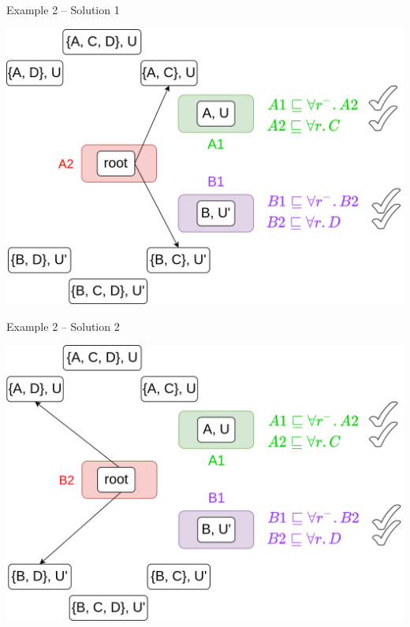 \documentclass[10pt]{beamer}
\begin{document}
\begin{frame}[fragile]{Example 2 -- Solution 1}
  \begin{center}
  \includegraphics[scale=.25]{img/ex2_3.png}
  \end{center}
\end{frame}

\begin{frame}[fragile]{Example 2 -- Solution 2}
  \begin{center}
  \includegraphics[scale=.25]{img/ex2_4.png}
  \end{center}
\end{frame}
\end{document}
